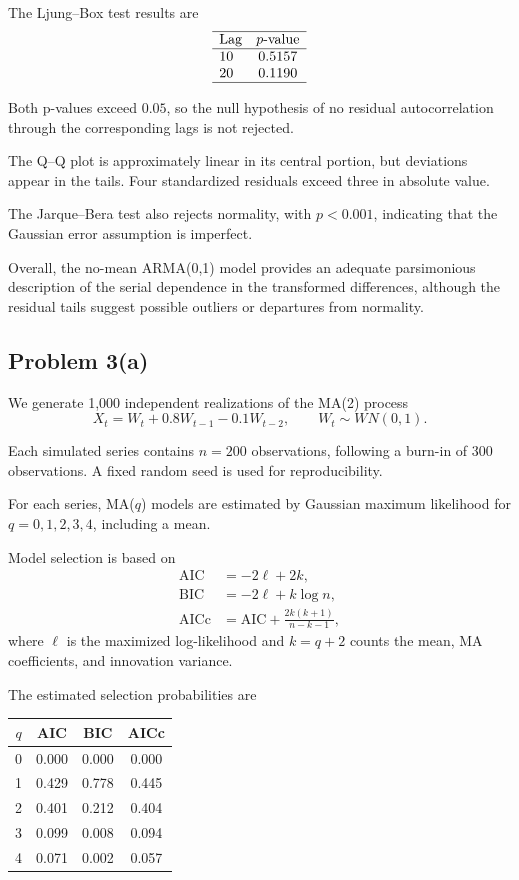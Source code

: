 \documentclass[11pt]{article}
\begin{document}
The Ljung--Box test results are
\[
\begin{array}{lc}
\hline
\text{Lag} & p\text{-value}\\
\hline
10 & 0.5157\\
20 & 0.1190\\
\hline
\end{array}
\]

Both p-values exceed \(0.05\), so the
null hypothesis of no residual
autocorrelation through the corresponding
lags is not rejected.

The Q--Q plot is approximately linear
in its central portion, but deviations
appear in the tails. Four standardized
residuals exceed three in absolute value.

The Jarque--Bera test also rejects normality,
with \(p<0.001\), indicating that the
Gaussian error assumption is imperfect.

Overall, the no-mean ARMA(0,1) model
provides an adequate parsimonious description
of the serial dependence in the transformed
differences, although the residual tails
suggest possible outliers or departures
from normality.


\subsection*{Problem 3(a)}

We generate 1,000 independent realizations
of the MA(2) process
\[
X_t=W_t+0.8W_{t-1}-0.1W_{t-2},
\qquad W_t\sim WN(0,1).
\]

Each simulated series contains \(n=200\)
observations, following a burn-in of
300 observations. A fixed random seed
is used for reproducibility.

For each series, MA(\(q\)) models are
estimated by Gaussian maximum likelihood
for \(q=0,1,2,3,4\), including a mean.

Model selection is based on
\[
\begin{aligned}
\mathrm{AIC}&=-2\ell+2k,\\
\mathrm{BIC}&=-2\ell+k\log n,\\
\mathrm{AICc}&=\mathrm{AIC}
+\frac{2k(k+1)}{n-k-1},
\end{aligned}
\]
where \(\ell\) is the maximized
log-likelihood and \(k=q+2\) counts
the mean, MA coefficients, and
innovation variance.

The estimated selection probabilities are

\begin{center}
\begin{tabular}{cccc}
\hline
\(q\) & AIC & BIC & AICc\\
\hline
0 & 0.000 & 0.000 & 0.000\\
1 & 0.429 & 0.778 & 0.445\\
2 & 0.401 & 0.212 & 0.404\\
3 & 0.099 & 0.008 & 0.094\\
4 & 0.071 & 0.002 & 0.057\\
\hline
\end{tabular}
\end{center}
\end{document}
